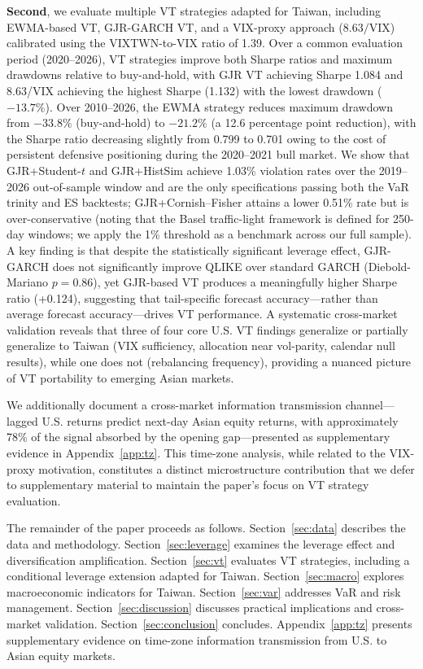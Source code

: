 \textbf{Second}, we evaluate multiple VT strategies adapted for Taiwan, including EWMA-based VT, GJR-GARCH VT, and a VIX-proxy approach ($8.63/\text{VIX}$) calibrated using the VIXTWN-to-VIX ratio of 1.39. Over a common evaluation period (2020--2026), VT strategies improve both Sharpe ratios and maximum drawdowns relative to buy-and-hold, with GJR VT achieving Sharpe 1.084 and 8.63/VIX achieving the highest Sharpe (1.132) with the lowest drawdown ($-13.7\%$). Over 2010--2026, the EWMA strategy reduces maximum drawdown from $-33.8\%$ (buy-and-hold) to $-21.2\%$ (a 12.6 percentage point reduction), with the Sharpe ratio decreasing slightly from 0.799 to 0.701 owing to the cost of persistent defensive positioning during the 2020--2021 bull market. We show that GJR+Student-$t$ and GJR+HistSim achieve 1.03\% violation rates over the 2019--2026 out-of-sample window and are the only specifications passing both the VaR trinity and ES backtests; GJR+Cornish--Fisher attains a lower 0.51\% rate but is over-conservative (noting that the Basel traffic-light framework is defined for 250-day windows; we apply the 1\% threshold as a benchmark across our full sample). A key finding is that despite the statistically significant leverage effect, GJR-GARCH does not significantly improve QLIKE over standard GARCH (Diebold-Mariano $p = 0.86$), yet GJR-based VT produces a meaningfully higher Sharpe ratio (+0.124), suggesting that tail-specific forecast accuracy---rather than average forecast accuracy---drives VT performance. A systematic cross-market validation reveals that three of four core U.S. VT findings generalize or partially generalize to Taiwan (VIX sufficiency, allocation near vol-parity, calendar null results), while one does not (rebalancing frequency), providing a nuanced picture of VT portability to emerging Asian markets.

We additionally document a cross-market information transmission channel---lagged U.S. returns predict next-day Asian equity returns, with approximately 78\% of the signal absorbed by the opening gap---presented as supplementary evidence in Appendix~\ref{app:tz}. This time-zone analysis, while related to the VIX-proxy motivation, constitutes a distinct microstructure contribution that we defer to supplementary material to maintain the paper's focus on VT strategy evaluation.

The remainder of the paper proceeds as follows. Section~\ref{sec:data} describes the data and methodology. Section~\ref{sec:leverage} examines the leverage effect and diversification amplification. Section~\ref{sec:vt} evaluates VT strategies, including a conditional leverage extension adapted for Taiwan. Section~\ref{sec:macro} explores macroeconomic indicators for Taiwan. Section~\ref{sec:var} addresses VaR and risk management. Section~\ref{sec:discussion} discusses practical implications and cross-market validation. Section~\ref{sec:conclusion} concludes. Appendix~\ref{app:tz} presents supplementary evidence on time-zone information transmission from U.S. to Asian equity markets.


